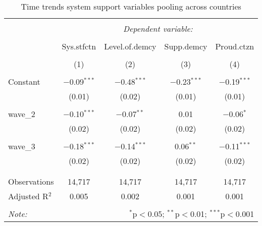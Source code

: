 
\begin{table}[!htbp] \centering 
  \caption{Time trends system support variables pooling across countries} 
  \label{tab:reg_sys_1} 
\begin{tabular}{@{\extracolsep{5pt}}lcccc} 
\\[-1.8ex]\hline 
\hline \\[-1.8ex] 
 & \multicolumn{4}{c}{\textit{Dependent variable:}} \\ 
\cline{2-5} 
\\[-1.8ex] & Sys.stfctn & Level.of.demcy & Supp.demcy & Proud.ctzn \\ 
\\[-1.8ex] & (1) & (2) & (3) & (4)\\ 
\hline \\[-1.8ex] 
 Constant & $-$0.09$^{***}$ & $-$0.48$^{***}$ & $-$0.23$^{***}$ & $-$0.19$^{***}$ \\ 
  & (0.01) & (0.02) & (0.01) & (0.01) \\ 
  & & & & \\ 
 wave\_2 & $-$0.10$^{***}$ & $-$0.07$^{**}$ & 0.01 & $-$0.06$^{*}$ \\ 
  & (0.02) & (0.02) & (0.02) & (0.02) \\ 
  & & & & \\ 
 wave\_3 & $-$0.18$^{***}$ & $-$0.14$^{***}$ & 0.06$^{**}$ & $-$0.11$^{***}$ \\ 
  & (0.02) & (0.02) & (0.02) & (0.02) \\ 
  & & & & \\ 
\hline \\[-1.8ex] 
Observations & 14,717 & 14,717 & 14,717 & 14,717 \\ 
Adjusted R$^{2}$ & 0.005 & 0.002 & 0.001 & 0.001 \\ 
\hline 
\hline \\[-1.8ex] 
\textit{Note:}  & \multicolumn{4}{r}{$^{*}$p$<$0.05; $^{**}$p$<$0.01; $^{***}$p$<$0.001} \\ 
\end{tabular} 
\end{table} 
